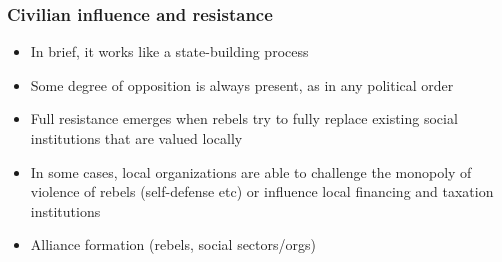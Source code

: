 \documentclass[aspectratio=43]{beamer}
\begin{document}
\begin{frame}
\frametitle{Civilian influence and resistance}
\centering

\begin{itemize}
  \item<1-> In brief, it works like a state-building process
  \item<2-> Some degree of opposition is always present, as in any political order
  \item<3-> Full resistance emerges when rebels try to fully replace existing social institutions that are valued locally
  \item<4-> In some cases, local organizations are able to challenge the monopoly of violence of rebels (self-defense etc) or influence local financing and taxation institutions
  \item<5-> Alliance formation (rebels, social sectors/orgs)
\end{itemize}

\end{frame}
\end{document}
